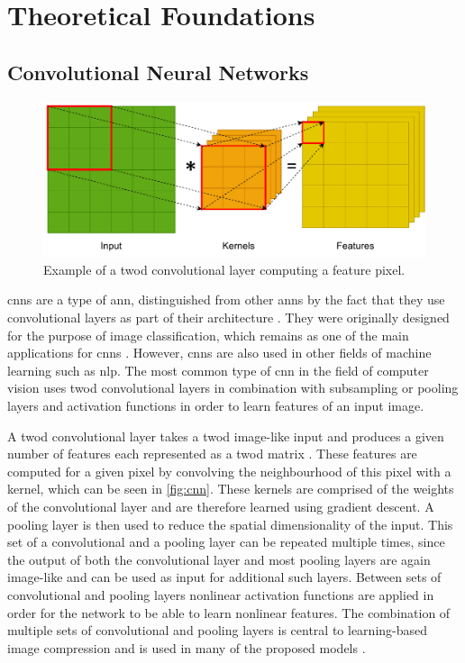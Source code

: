 \chapter{Theoretical Foundations\label{cha:chapter3}}

\section{Convolutional Neural Networks}
\begin{figure}[t]
\centering
\includegraphics[scale=0.8]{CNN.pdf}
\caption[Example of convolutional layer]{Example of a \ac{twod} convolutional layer computing a feature pixel.}
\label{fig:cnn}
\end{figure}

\Acp{cnn} are a type of \ac{ann}, distinguished from other \acp{ann} by the fact that they use convolutional layers as part of their architecture \citep{oshea_introduction_2015}. They were originally designed for the purpose of image classification, which remains as one of the main applications for \acp{cnn} \citep{gu_recent_2018}. However, \acp{cnn} are also used in other fields of machine learning such as \ac{nlp}. The most common type of \ac{cnn} in the field of computer vision uses \ac{twod} convolutional layers in combination with subsampling or pooling layers and activation functions in order to learn features of an input image. 

A \ac{twod} convolutional layer takes a \ac{twod} image-like input and produces a given number of features each represented as a \ac{twod} matrix \citep{gu_recent_2018}. These features are computed for a given pixel by convolving the neighbourhood of this pixel with a kernel, which can be seen in \autoref{fig:cnn}. These kernels are comprised of the weights of the convolutional layer and are therefore learned using gradient descent. A pooling layer is then used to reduce the spatial dimensionality of the input. This set of a convolutional and a pooling layer can be repeated multiple times, since the output of both the convolutional layer and most pooling layers are again image-like and can be used as input for additional such layers. Between sets of convolutional and pooling layers nonlinear activation functions are applied in order for the network to be able to learn nonlinear features. The combination of multiple sets of convolutional and pooling layers  is central to learning-based image compression and is used in many of the proposed models \citep{balle_end--end_2017,balle_variational_2018,kuester_1d-convolutional_2021,kuester_transferability_2022,guo_learned_2021}.

